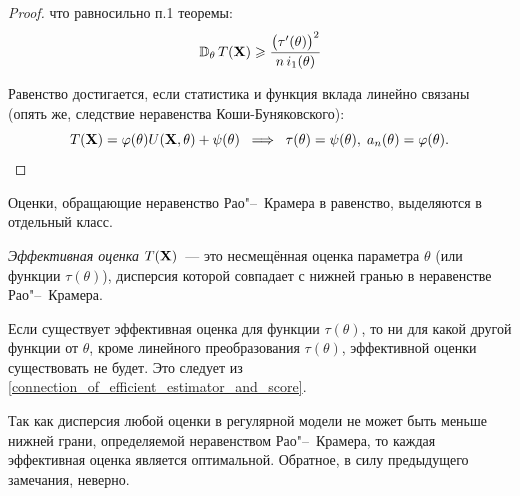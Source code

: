 \begin{proof}
    что равносильно п.1 теоремы:
    \begin{equation*}
        \operatorname{\mathbb{D}_{\theta}} T(\mathbf{X}) \geqslant \cfrac{\bigl(\tau'(\theta)\bigr)^{2}}{n \, i_1(\theta)}
    \end{equation*}

    Равенство достигается, если статистика и функция вклада линейно связаны (опять же, следствие неравенства Коши-Буняковского):
    \begin{equation}
        \label{connection_of_efficient_estimator_and_score}
        T(\mathbf{X})=\varphi(\theta) U(\mathbf{X}, \theta)+\psi(\theta)
        \; \implies \;
        \tau(\theta)=\psi(\theta), \; a_{n}(\theta)=\varphi(\theta). \qedhere
    \end{equation}
\end{proof}

Оценки, обращающие неравенство Рао"--~Крамера в равенство, выделяются в отдельный класс.
\begin{defn}
    \textit{Эффективная оценка} $T(\mathbf{X})$~--- это несмещённая оценка параметра $\theta$ (или функции $\tau(\theta)$), дисперсия которой совпадает с нижней гранью в неравенстве Рао"--~Крамера.
\end{defn}

\begin{rmrk}
    Если существует эффективная оценка для функции $\tau(\theta)$, то ни для какой другой функции от $\theta$, кроме линейного преобразования $\tau(\theta)$, эффективной оценки существовать не будет. 
    Это следует из \eqref{connection_of_efficient_estimator_and_score}.
\end{rmrk}
Так как дисперсия любой оценки в регулярной модели не может быть меньше нижней грани, определяемой неравенством Рао"--~Крамера, то каждая эффективная оценка является оптимальной.
Обратное, в силу предыдущего замечания, неверно.

